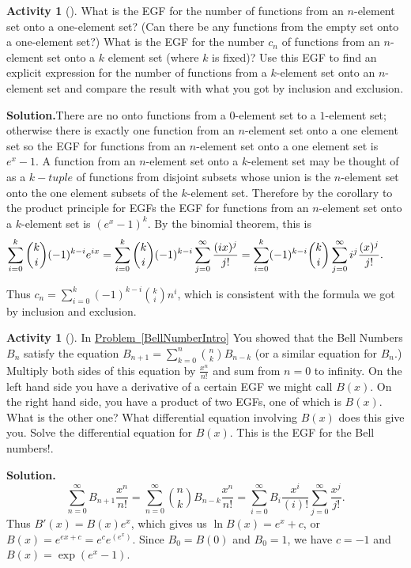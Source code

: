 \documentclass[10pt,]{book}
\theoremstyle{plain}
\theoremstyle{definition}
\newtheorem{activity}[project]{Activity}
\numberwithin{equation}{chapter}
\begin{document}
\begin{activity}[]\label{activity-379}
What is the EGF for the number of functions from an \(n\)-element set onto a one-element set? (Can there be any functions from the empty set onto a one-element set?) What is the EGF for the number \(c_n\) of functions from an \(n\)-element set onto a \(k\) element set (where \(k\) is fixed)? Use this EGF to find an explicit expression for the number of functions from a \(k\)-element set onto an \(n\)-element set and compare the result with what you got by inclusion and exclusion.%
\par\medskip\noindent%
\textbf{Solution.}\quad There are no onto functions from a \(0\)-element set to a \(1\)-element set; otherwise there is exactly one function from an \(n\)-element set onto a one element set so the EGF for functions from an \(n\)-element set onto a one element set is \(e^x-1\). A function from an \(n\)-element set onto a \(k\)-element set may be thought of as a \(k-tuple\) of functions from disjoint subsets whose union is the \(n\)-element set onto the one element subsets of the \(k\)-element set. Therefore by the corollary to the product principle for EGFs the EGF for functions from an \(n\)-element set onto a \(k\)-element set is \((e^x-1)^k\). By the binomial theorem, this is%
\begin{equation*}
\kern-.25 in\sum_{i=0}^k\binom{k}{i}(-1)^{k-i}e^{ix}
=
\sum_{i=0}^k \binom{k}{i} (-1)^{k-i} \sum_{j=0}^\infty \frac{(ix)^j}{j!} =
\sum_{i=0}^k (-1)^{k-i}\binom{k}{i} \sum_{j=0}^\infty i^j\frac{(x)^j}{j!}.
\end{equation*}
%
\par
Thus \(c_n= \sum_{i=0}^k(-1)^{k-i}\binom{k}{i}n^i\), which is consistent with the formula we got by inclusion and exclusion.%
\end{activity}
\begin{activity}[]\label{BellNumbersEGF}
In \hyperref[BellNumberIntro]{Problem~\ref{BellNumberIntro}} You showed that the Bell Numbers \(B_n\) satisfy the equation \(B_{n+1} =
\sum_{k=0}^{n} \binom{n}{k}B_{n-k}\) (or a similar equation for \(B_n\).) Multiply both sides of this equation by \(\frac{x^n}{n!}\) and sum from \(n=0\) to infinity. On the left hand side you have a derivative of a certain EGF we might call \(B(x)\). On the right hand side, you have a product of two EGFs, one of which is \(B(x)\). What is the other one? What differential equation involving \(B(x)\) does this give you. Solve the differential equation for \(B(x)\). This is the EGF for the Bell numbers!.%
\par\medskip\noindent%
\textbf{Solution.}\quad %
\begin{equation*}
\sum_{n=0}^\infty B_{n+1}\frac{x^n}{n!} = \sum_{n=0}^\infty\binom{n}{k}B_{n-k}\frac{x^n}{n!} =\sum_{i=0}^\infty B_{i}\frac{x^{i}}{(i)!}\sum_{j=0}^\infty \frac{x^j}{j!}.
\end{equation*}
Thus \(B'(x) = B(x)e^x\), which gives us \(\ln B(x) = e^x+c\), or \(B(x) =
e^{ex+c} =e^ce^{(e^x)}\). Since \(B_0=B(0)\) and \(B_0=1\), we have \(c=-1\) and \(B(x) = \exp(e^x-1)\).%
\end{activity}
\end{document}
